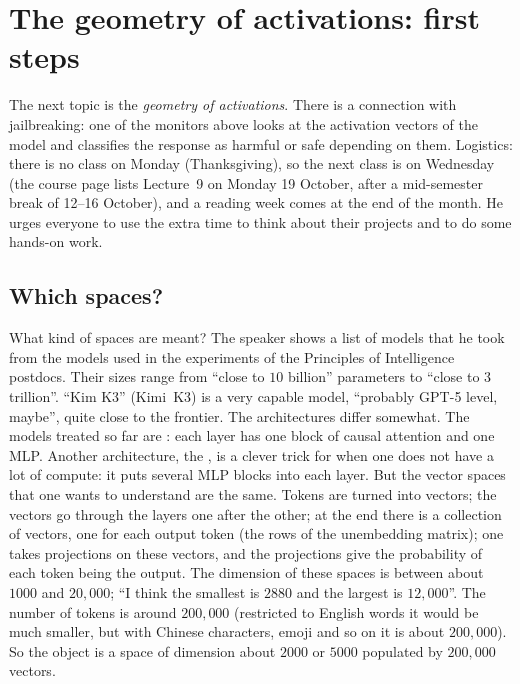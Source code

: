 
\section{The geometry of activations: first steps}\label{sec:L8-geometry}
The next topic is the \emph{geometry of activations}. There is a connection with jailbreaking: one of the monitors above looks at the activation vectors of the model and classifies the response as harmful or safe depending on them. Logistics: there is no class on Monday (Thanksgiving), so the next class is on Wednesday\flag{} (the course page lists Lecture~9 on Monday 19 October, after a mid-semester break of 12--16 October), and a reading week comes at the end of the month. He urges everyone to use the extra time to think about their projects and to do some hands-on work.

\subsection{Which spaces?}\label{sec:L8-spaces}
What kind of spaces are meant? The speaker shows a list of models that he took from the models used in the experiments of the Principles of Intelligence postdocs. Their sizes range from ``close to $10$ billion'' parameters to ``close to $3$ trillion''. ``Kim K3''\flag{} (Kimi~K3) is a very capable model, ``probably GPT-5 level, maybe'', quite close to the frontier. The architectures differ somewhat. The models treated so far are : each layer has one block of causal attention and one MLP. Another architecture, the , is a clever trick for when one does not have a lot of compute: it puts several MLP blocks into each layer. But the vector spaces that one wants to understand are the same. Tokens are turned into vectors; the vectors go through the layers one after the other; at the end there is a collection of vectors, one for each output token (the rows of the unembedding matrix); one takes projections on these vectors, and the projections give the probability of each token being the output. The dimension of these spaces is between about $1000$ and $20{,}000$; ``I think the smallest is $2880$ and the largest is $12{,}000$''\flag. The number of tokens is around $200{,}000$ (restricted to English words it would be much smaller, but with Chinese characters, emoji and so on it is about $200{,}000$). So the object is a space of dimension about $2000$ or $5000$ populated by $200{,}000$ vectors.

